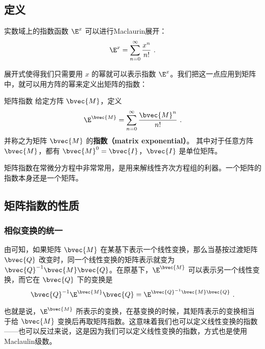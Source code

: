 
\begin{issues}
\issueMissDepend
\end{issues}

\subsection{定义}
实数域上的指数函数 $\E^x$ 可以进行Maclaurin展开：\begin{equation}
\E^x=\sum\limits_{n=0}^\infty \frac{x^n}{n!}~.
\end{equation}

展开式使得我们只需要用 $x$ 的幂就可以表示指数 $\E^x$。我们把这一点应用到矩阵中，就可以用方阵的幂来定义出矩阵的指数：

\begin{definition}{矩阵指数}
给定方阵 $\bvec{M}$，定义
\begin{equation}\label{eq_MatExp_2}
\E^{\bvec{M}}=\sum_{n=0}^\infty \frac{\bvec{M}^n}{n!}~.
\end{equation}
并称之为矩阵 $\bvec{M}$ 的\textbf{指数（matrix exponential）}。 其中对于任意方阵 $\bvec{M}$，都有 $\bvec{M}^0=\bvec{I}$，$\bvec{I}$ 是单位矩阵。
\end{definition}

矩阵指数在常微分方程中非常常用，是用来解线性齐次方程组的利器。一个矩阵的指数本身还是一个矩阵。

\subsection{矩阵指数的性质}

\subsubsection{相似变换的统一}

由可知，如果矩阵 $\bvec{M}$ 在某基下表示一个线性变换，那么当基按过渡矩阵 $\bvec{Q}$ 改变时，同一个线性变换的矩阵表示就变为 $\bvec{Q}^{-1}\bvec{M}\bvec{Q}$。在原基下，$\E^{\bvec{M}}$ 可以表示另一个线性变换，而它在 $\bvec{Q}$ 下的变换是
\begin{equation}\label{eq_MatExp_1}
\bvec{Q}^{-1}\E^{\bvec{M}}\bvec{Q}=\E^{\bvec{Q}^{-1}\bvec{M}\bvec{Q}}~.
\end{equation}

也就是说，$\E^{\bvec{M}}$ 所表示的变换，在基变换的时候，其矩阵表示的变换相当于给 $\bvec{M}$ 变换后再取矩阵指数。这意味着我们也可以定义线性变换的指数——也可以反过来说，这是因为我们可以定义线性变换的指数，方式也是使用Maclaulin级数。

